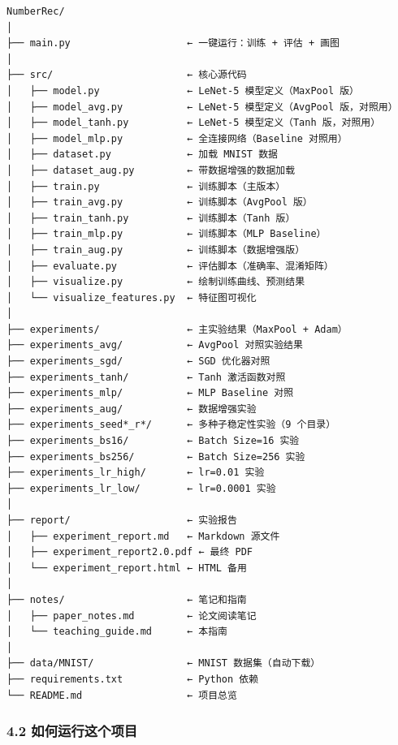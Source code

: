 \documentclass[
  11pt,
]{ctexart}
\begin{document}
\begin{verbatim}
NumberRec/
│
├── main.py                    ← 一键运行：训练 + 评估 + 画图
│
├── src/                       ← 核心源代码
│   ├── model.py               ← LeNet-5 模型定义（MaxPool 版）
│   ├── model_avg.py           ← LeNet-5 模型定义（AvgPool 版，对照用）
│   ├── model_tanh.py          ← LeNet-5 模型定义（Tanh 版，对照用）
│   ├── model_mlp.py           ← 全连接网络（Baseline 对照用）
│   ├── dataset.py             ← 加载 MNIST 数据
│   ├── dataset_aug.py         ← 带数据增强的数据加载
│   ├── train.py               ← 训练脚本（主版本）
│   ├── train_avg.py           ← 训练脚本（AvgPool 版）
│   ├── train_tanh.py          ← 训练脚本（Tanh 版）
│   ├── train_mlp.py           ← 训练脚本（MLP Baseline）
│   ├── train_aug.py           ← 训练脚本（数据增强版）
│   ├── evaluate.py            ← 评估脚本（准确率、混淆矩阵）
│   ├── visualize.py           ← 绘制训练曲线、预测结果
│   └── visualize_features.py  ← 特征图可视化
│
├── experiments/               ← 主实验结果（MaxPool + Adam）
├── experiments_avg/           ← AvgPool 对照实验结果
├── experiments_sgd/           ← SGD 优化器对照
├── experiments_tanh/          ← Tanh 激活函数对照
├── experiments_mlp/           ← MLP Baseline 对照
├── experiments_aug/           ← 数据增强实验
├── experiments_seed*_r*/      ← 多种子稳定性实验（9 个目录）
├── experiments_bs16/          ← Batch Size=16 实验
├── experiments_bs256/         ← Batch Size=256 实验
├── experiments_lr_high/       ← lr=0.01 实验
├── experiments_lr_low/        ← lr=0.0001 实验
│
├── report/                    ← 实验报告
│   ├── experiment_report.md   ← Markdown 源文件
│   ├── experiment_report2.0.pdf ← 最终 PDF
│   └── experiment_report.html ← HTML 备用
│
├── notes/                     ← 笔记和指南
│   ├── paper_notes.md         ← 论文阅读笔记
│   └── teaching_guide.md      ← 本指南
│
├── data/MNIST/                ← MNIST 数据集（自动下载）
├── requirements.txt           ← Python 依赖
└── README.md                  ← 项目总览
\end{verbatim}

\subsubsection{4.2
如何运行这个项目}\label{ux5982ux4f55ux8fd0ux884cux8fd9ux4e2aux9879ux76ee}
\end{document}
